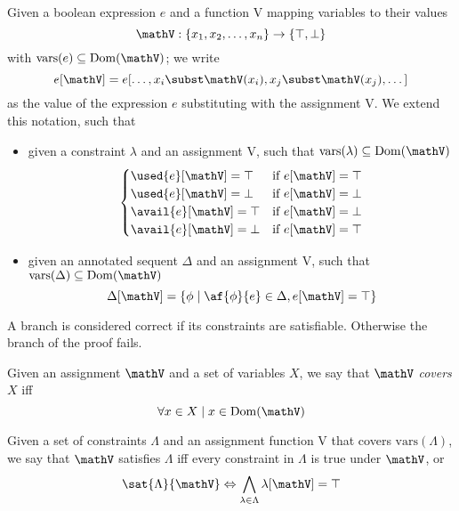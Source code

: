 \begin{define}[Evaluation]
	Given a boolean expression $e$ and a function V mapping variables to their values 
	$$ \mathV : \{ x_1, x_2, \dots, x_n \} \rightarrow \{ \top, \bot \} $$
	with $\mathrm{vars}(e) \subseteq \mathrm{Dom}(\mathV)$; we write
		$$ e[\mathV] = e[\dots, x_i \subst \mathV(x_i), x_j \subst \mathV(x_j), \dots] $$
	as the value of the expression $e$ substituting with the assignment V.
	We extend this notation, such that
	\begin{itemize}
		\item given a constraint $\lambda$ and an assignment V, such that $\mathrm{vars}(\lambda) \subseteq \mathrm{Dom}(\mathV)$
			$$ 
			\begin{cases} 
				\used{e}[\mathV] = \top & \text{if } e[\mathV] = \top \\
				\used{e}[\mathV] = \bot & \text{if } e[\mathV] = \bot \\
				\avail{e}[\mathV] = \top & \text{if } e[\mathV] = \bot \\
				\avail{e}[\mathV] = \bot & \text{if } e[\mathV] = \top \\
			\end{cases}
			$$
		\item given an annotated sequent $\Delta$ and an assignment V, such that $\mathrm{vars}(\Delta) \subseteq \mathrm{Dom}(\mathV)$
			$$ \Delta[\mathV] = \{ \phi \mid \af{\phi}{e} \in \Delta , e[\mathV] = \top \} $$
	\end{itemize}
\end{define}
A branch is considered correct if its constraints are satisfiable.
Otherwise the branch of the proof fails.
\begin{define}[Covering]
	Given an assignment $\mathV$ and a set of variables $X$, we say that $\mathV$ \textit{covers} $X$ iff
	$$ \forall x \in X \mid x \in \mathrm{Dom}(\mathV) $$
\end{define}
\begin{define}
	\label{def:sat}
	Given a set of constraints $\Lambda$ and an assignment function V that covers $\mathrm{vars}(\Lambda)$, we say that $\mathV$ satisfies $\Lambda$ iff every constraint in $\Lambda$ is true under $\mathV$, or
	$$ \sat{\Lambda}{\mathV} \Leftrightarrow \bigwedge_{\lambda \in \Lambda} \lambda[\mathV] = \top $$
\end{define}

